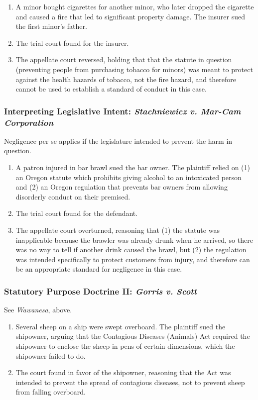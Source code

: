 \begin{enumerate}
    \item A minor bought cigarettes for another minor, who later dropped the 
    cigarette and caused a fire that led to significant property damage. The 
    insurer sued the first minor's father.
    \item The trial court found for the insurer.
    \item The appellate court reversed, holding that that the statute in 
    question (preventing people from purchasing tobacco for minors) was meant 
    to protect against the health hazards of tobacco, not the fire hazard, and 
    therefore cannot be used to establish a standard of conduct in this case.
\end{enumerate}

\subsubsection{Interpreting Legislative Intent: \emph{Stachniewicz v. Mar-Cam 
Corporation}}

Negligence per se applies if the legislature intended to prevent the harm in 
question.

\begin{enumerate}
    \item A patron injured in bar brawl sued the bar owner. The plaintiff 
    relied on (1) an Oregon statute which prohibits giving alcohol to an 
    intoxicated person and (2) an Oregon regulation that prevents bar owners 
    from allowing disorderly conduct on their premised.
    \item The trial court found for the defendant. 
    \item The appellate court overturned, reasoning that (1) the 
    statute was inapplicable because the brawler was already drunk when he 
    arrived, so there was no way to tell if another drink caused the brawl, but 
    (2) the regulation was intended specifically to protect customers from 
    injury, and therefore can be an appropriate standard for negligence in 
    this case.
\end{enumerate}

\subsubsection{Statutory Purpose Doctrine II: \emph{Gorris v. Scott}}

See \emph{Wawanesa}, above.

\begin{enumerate}
    \item Several sheep on a ship were swept overboard. The plaintiff sued the 
    shipowner, arguing that the Contagious Diseases (Animals) Act required the 
    shipowner to enclose the sheep in pens of certain dimensions, which the 
    shipowner failed to do.
    \item The court found in favor of the shipowner, 
    reasoning that the Act was intended to prevent the spread of contagious 
    diseases, not to prevent sheep from falling overboard.
\end{enumerate}
